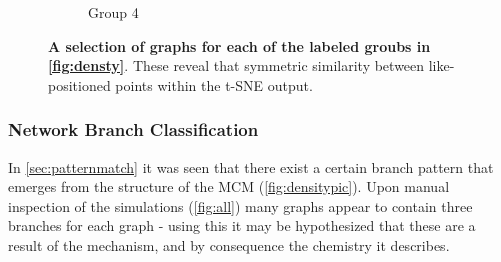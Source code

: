 \begin{figure}[H]
\begin{subfigure}[b]{.23\textwidth}
     \caption{Group 4}
     \end{subfigure}
        \caption{\textbf{A selection of graphs for each of the labeled groubs in \autoref{fig:densty}}. These reveal that symmetric similarity between like-positioned points within the t-SNE output.  }
      \label{fig:densitypic}
\end{figure}




\subsubsection{Network Branch Classification}\label{sec:netshape}
In \autoref{sec:patternmatch} it was seen that there exist a certain branch pattern that emerges from the structure of the MCM (\autoref{fig:densitypic}). Upon manual inspection of the simulations (\autoref{fig:all}) many graphs appear to contain three branches for each graph - using this it may be hypothesized that these are a result of the mechanism, and by consequence the chemistry it describes.

